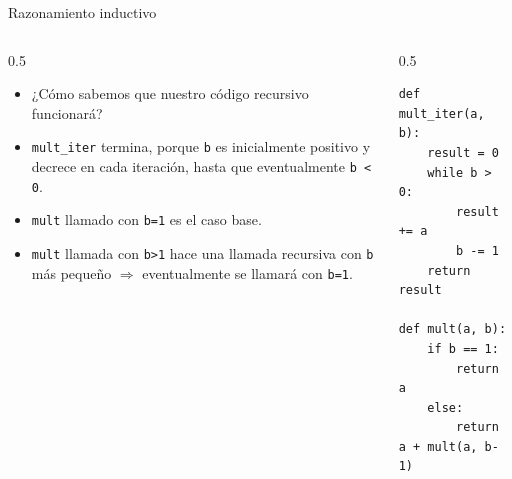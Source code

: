 \documentclass[mathserif]{beamer}
\begin{document}
\begin{frame}[fragile]{Razonamiento inductivo}
    \begin{columns}
        \begin{column}{0.5\textwidth}
            \begin{itemize}
                \item ¿Cómo sabemos que nuestro código recursivo funcionará?
                
                \item \lstinline|mult_iter| termina, porque \lstinline|b| es inicialmente positivo y decrece en cada iteración, hasta que eventualmente \lstinline|b < 0|.
                
                \item \lstinline|mult| llamado con \lstinline|b=1| es el caso {\blue base}.
                
                \item \lstinline|mult| llamada con  \lstinline|b>1| hace una llamada recursiva con \lstinline|b| más pequeño $\Rightarrow$ eventualmente se llamará con \lstinline|b=1|.
            \end{itemize}
        \end{column}
        \begin{column}{0.5\textwidth}
\begin{lstlisting}
def mult_iter(a, b): 
    result = 0
    while b > 0: 
        result += a
        b -= 1
    return result

def mult(a, b):
    if b == 1:
        return a
    else:
        return a + mult(a, b-1)
\end{lstlisting}
        \end{column}
    \end{columns}
\end{frame}
\end{document}
